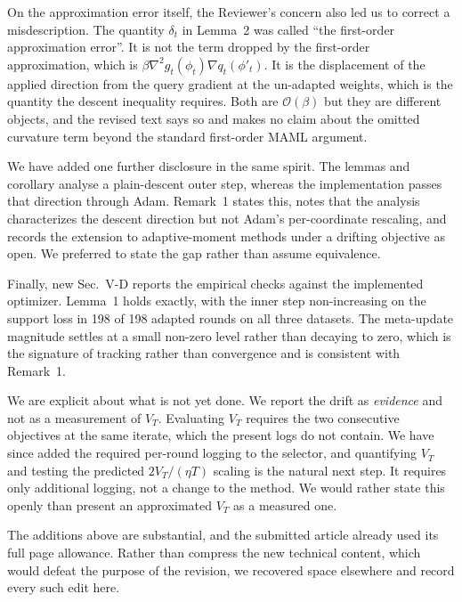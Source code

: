 \documentclass[10pt]{article}
\begin{document}
On the approximation error itself, the Reviewer's concern also led us to correct a misdescription. The quantity $\delta_t$ in Lemma~2 was called ``the first-order approximation error''. It is not the term dropped by the first-order approximation, which is $\beta\nabla^2 g_t(\phi_t)\nabla q_t(\phi'_t)$. It is the displacement of the applied direction from the query gradient at the un-adapted weights, which is the quantity the descent inequality requires. Both are $\mathcal{O}(\beta)$ but they are different objects, and the revised text says so and makes no claim about the omitted curvature term beyond the standard first-order MAML argument.

We have added one further disclosure in the same spirit. The lemmas and corollary analyse a plain-descent outer step, whereas the implementation passes that direction through Adam. Remark~1 states this, notes that the analysis characterizes the descent direction but not Adam's per-coordinate rescaling, and records the extension to adaptive-moment methods under a drifting objective as open. We preferred to state the gap rather than assume equivalence.

Finally, new Sec.~V-D reports the empirical checks against the implemented optimizer. Lemma~1 holds exactly, with the inner step non-increasing on the support loss in 198 of 198 adapted rounds on all three datasets. The meta-update magnitude settles at a small non-zero level rather than decaying to zero, which is the signature of tracking rather than convergence and is consistent with Remark~1.

We are explicit about what is not yet done. We report the drift as \emph{evidence} and not as a measurement of $V_T$. Evaluating $V_T$ requires the two consecutive objectives at the same iterate, which the present logs do not contain. We have since added the required per-round logging to the selector, and quantifying $V_T$ and testing the predicted $2V_T/(\eta T)$ scaling is the natural next step. It requires only additional logging, not a change to the method. We would rather state this openly than present an approximated $V_T$ as a measured one.

\vspace{1em}

\vspace{0.5em}
The additions above are substantial, and the submitted article already used its full page allowance. Rather than compress the new technical content, which would defeat the purpose of the revision, we recovered space elsewhere and record every such edit here.
\end{document}

